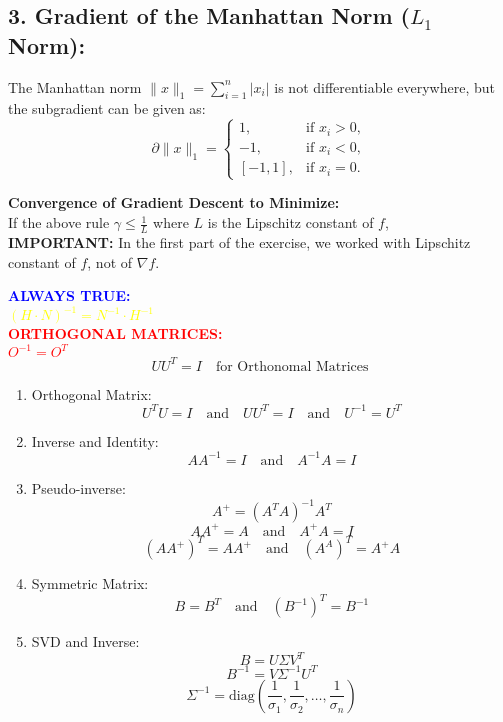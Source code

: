 \documentclass{article}
\begin{document}
\subsection*{3. Gradient of the Manhattan Norm ($L_1$ Norm):}
The Manhattan norm $\|x\|_1 = \sum_{i=1}^{n} |x_i|$ is not differentiable everywhere, but the subgradient can be given as:
\[
\partial \|x\|_1 =
\begin{cases}
1, & \text{if } x_i > 0, \\
-1, & \text{if } x_i < 0, \\
[-1, 1], & \text{if } x_i = 0.
\end{cases}
\]

\textbf{Convergence of Gradient Descent to Minimize:} \\
If the above rule $\gamma \leq \frac{1}{L}$ where $L$ is the Lipschitz constant of $f$, \\
\textbf{IMPORTANT:} In the first part of the exercise, we worked with Lipschitz constant of $f$, not of $\nabla f$.









\noindent\textcolor{blue}{\textbf{ALWAYS TRUE:}}\\
\textcolor{yellow}{\((H \cdot N)^{-1} = N^{-1} \cdot H^{-1}\)}\\

\vspace{1em}
\noindent\textcolor{red}{\textbf{ORTHOGONAL MATRICES:}}\\
\textcolor{red}{\(O^{-1} = O^{T}\)}\\

\vspace{1em}
\[
UU^{T} = I \quad \text{for Orthonomal Matrices}
\]




\begin{enumerate}
    \item Orthogonal Matrix:
    \[
    U^TU = I \quad \text{and} \quad UU^T = I \quad \text{and} \quad U^{-1} = U^T
    \]
    \item Inverse and Identity:
    \[
    AA^{-1} = I \quad \text{and} \quad A^{-1}A = I
    \]
    \item Pseudo-inverse:
    \[
    A^+ = (A^TA)^{-1}A^T
    \]
    \[
    AA^+ = A \quad \text{and} \quad A^+A = I
    \]
    \[
    (AA^+)^T = AA^+ \quad \text{and} \quad (A^A)^T = A^+A
    \]
    \item Symmetric Matrix:
    \[
    B = B^T \quad \text{and} \quad (B^{-1})^T = B^{-1}
    \]
    \item SVD and Inverse:
    \[
    B = U\Sigma V^T
    \]
    \[
    B^{-1} = V\Sigma^{-1}U^T
    \]
    \[
    \Sigma^{-1} = \text{diag}\left(\frac{1}{\sigma_1}, \frac{1}{\sigma_2}, \ldots, \frac{1}{\sigma_n}\right)
    \]
\end{enumerate}
\end{document}

